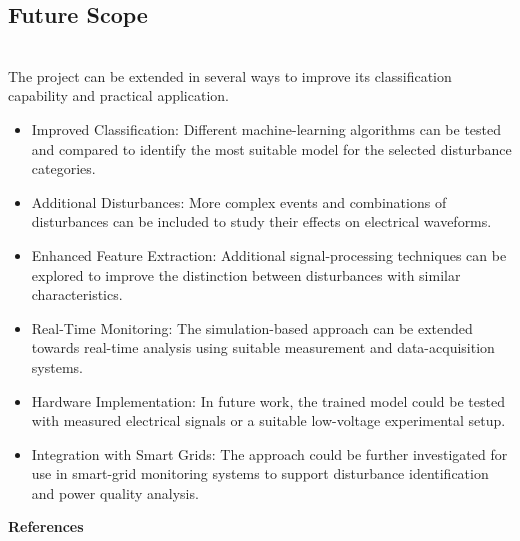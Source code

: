 \documentclass[12pt]{article}
\begin{document}
\begin{center}
\begin{enumerate}
\subsection{Future Scope}\\
\justifying The project can be extended in several ways to improve its classification capability and practical application.
\justifying
\begin{itemize}
    \item  Improved Classification: Different machine-learning algorithms can be tested and compared to identify the most suitable model for the selected disturbance categories.
\end{itemize}\begin{itemize}
    \item Additional Disturbances: More complex events and combinations of disturbances can be included to study their effects on electrical waveforms.
\end{itemize}
\begin{itemize}
    \item Enhanced Feature Extraction: Additional signal-processing techniques can be explored to improve the distinction between disturbances with similar characteristics.
\end{itemize}\begin{itemize}
    \item Real-Time Monitoring: The simulation-based approach can be extended towards real-time analysis using suitable measurement and data-acquisition systems.
\end{itemize}
\begin{itemize}
    \item  Hardware Implementation: In future work, the trained model could be tested with measured electrical signals or a suitable low-voltage experimental setup.
\end{itemize}\begin{itemize}
    \item Integration with Smart Grids: The approach could be further investigated for use in smart-grid monitoring systems to support disturbance identification and power quality analysis.
\end{itemize}

\clearpage

\begin{center}
    \vspace{2cm}
    \textbf{\LARGE References}\\[2cm]
\end{center}

\end{enumerate}
\end{center}
\end{document}
